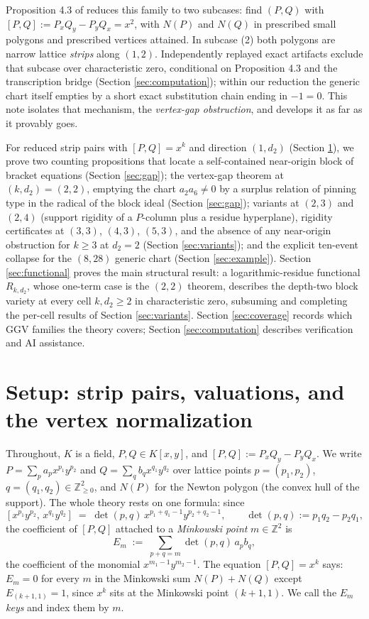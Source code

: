 \documentclass[11pt]{article}
\theoremstyle{definition}
\theoremstyle{remark}
\begin{document}
Proposition 4.3 of \cite{GGHV} reduces this family to two subcases: find $(P,Q)$ with $[P,Q]:=P_xQ_y-P_yQ_x=x^2$, with $N(P)$ and $N(Q)$ in prescribed small polygons and prescribed vertices attained. In subcase (2) both polygons are narrow lattice \emph{strips} along $(1,2)$. Independently replayed exact artifacts exclude that subcase over characteristic zero, conditional on Proposition 4.3 and the transcription bridge (Section \ref{sec:computation}); within our reduction the generic chart itself empties by a short exact substitution chain ending in $-1=0$. This note isolates that mechanism, the \emph{vertex-gap obstruction}, and develops it as far as it provably goes.

For reduced strip pairs with $[P,Q]=x^k$ and direction $(1,d_2)$ (Section \ref{sec:setup}), we prove two counting propositions that locate a self-contained near-origin block of bracket equations (Section \ref{sec:gap}); the vertex-gap theorem at $(k,d_2)=(2,2)$, emptying the chart $a_2a_6\neq 0$ by a surplus relation of pinning type in the radical of the block ideal (Section \ref{sec:gap}); variants at $(2,3)$ and $(2,4)$ (support rigidity of a $P$-column plus a residue hyperplane), rigidity certificates at $(3,3)$, $(4,3)$, $(5,3)$, and the absence of any near-origin obstruction for $k\geq 3$ at $d_2=2$ (Section \ref{sec:variants}); and the explicit ten-event collapse for the $(8,28)$ generic chart (Section \ref{sec:example}). Section \ref{sec:functional} proves the main structural result: a logarithmic-residue functional $R_{k,d_2}$, whose one-term case is the $(2,2)$ theorem, describes the depth-two block variety at every cell $k,d_2\geq 2$ in characteristic zero, subsuming and completing the per-cell results of Section \ref{sec:variants}. Section \ref{sec:coverage} records which GGV families the theory covers; Section \ref{sec:computation} describes verification and AI assistance.

\section{Setup: strip pairs, valuations, and the vertex normalization}\label{sec:setup}

Throughout, $K$ is a field, $P,Q\in K[x,y]$, and $[P,Q]:=P_xQ_y-P_yQ_x$. We write $P=\sum_p a_p x^{p_1}y^{p_2}$ and $Q=\sum_q b_q x^{q_1}y^{q_2}$ over lattice points $p=(p_1,p_2)$, $q=(q_1,q_2)\in\mathbb{Z}_{\geq 0}^2$, and $N(P)$ for the Newton polygon (the convex hull of the support). The whole theory rests on one formula: since
\[
[x^{p_1}y^{p_2},\,x^{q_1}y^{q_2}] \;=\; \det(p,q)\, x^{p_1+q_1-1}y^{p_2+q_2-1},
\qquad \det(p,q):=p_1q_2-p_2q_1,
\]
the coefficient of $[P,Q]$ attached to a \emph{Minkowski point} $m\in\mathbb{Z}^2$ is
\begin{equation}\label{eq:key}
E_m \;:=\; \sum_{p+q=m} \det(p,q)\, a_p b_q ,
\end{equation}
the coefficient of the monomial $x^{m_1-1}y^{m_2-1}$. The equation $[P,Q]=x^k$ says: $E_m=0$ for every $m$ in the Minkowski sum $N(P)+N(Q)$ except $E_{(k+1,1)}=1$, since $x^k$ sits at the Minkowski point $(k+1,1)$. We call the $E_m$ \emph{keys} and index them by $m$.
\end{document}
